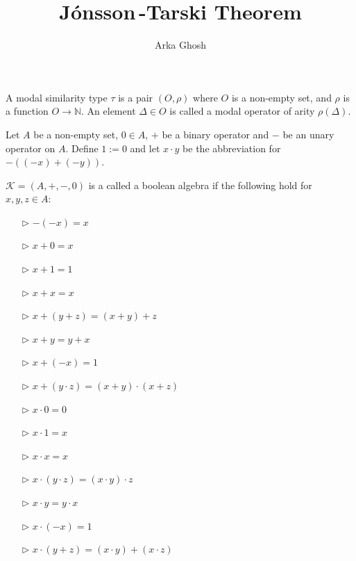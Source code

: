 \documentclass[10pt]{beamer}
\title{J\' onsson\,-Tarski Theorem}
\author{Arka Ghosh}
\date{}
\theoremstyle{definition}
\theoremstyle{definition}
\begin{document}
\begin{frame}\label{frame:titlepage}
\titlepage
\end{frame}


\begin{frame}\label{frame:modal similarity type}
\begin{definition}\label{defn:modal similarity type}
A modal similarity type $\tau$ is a pair $(O,\rho)$ where $O$ is a non-empty set, 
and $\rho$ is a function $O\to\mathbb{N}$. An element $\Delta \in O$ is called a modal
operator of arity $\rho(\Delta)$.
\end{definition}
\end{frame}


\begin{frame}\label{frame:boolean algebra}
\begin{definition}\label{defn:boolean algebra}
Let $A$ be a non-empty set, $0 \in A$, $+$ be a binary operator and $-$ be an unary operator
on $A$. Define $1 := 0$ and let $x\cdot y$ be the abbreviation for $-((-x)+(-y))$.\smallskip

$\mathcal{K} = (A,+,-,0)$ is a called a boolean algebra if the following hold
for $x, y, z \in A$:
\begin{multicols}{2}
\begin{enumerate}
\item[$\triangleright$] $-(-x) = x$
\item[$\triangleright$] $x + 0 = x$
\item[$\triangleright$] $x + 1 = 1$
\item[$\triangleright$] $x + x = x$
\item[$\triangleright$] $x + (y + z) = (x + y) + z$
\item[$\triangleright$] $x + y = y + x$
\item[$\triangleright$] $x + (-x) = 1$
\item[$\triangleright$] $x + (y\cdot z) = (x + y) \cdot (x + z)$
\item[]
\item[$\triangleright$] $x \cdot 0 = 0$
\item[$\triangleright$] $x \cdot 1 = x$
\item[$\triangleright$] $x \cdot x = x$
\item[$\triangleright$] $x \cdot (y \cdot z) = (x \cdot y) \cdot z$
\item[$\triangleright$] $x \cdot y = y \cdot x$
\item[$\triangleright$] $x \cdot (-x) = 1$
\item[$\triangleright$] $x \cdot (y + z) = (x \cdot y) + (x \cdot z)$
\end{enumerate}
\end{multicols}
\end{definition}
\end{frame}
\end{document}

